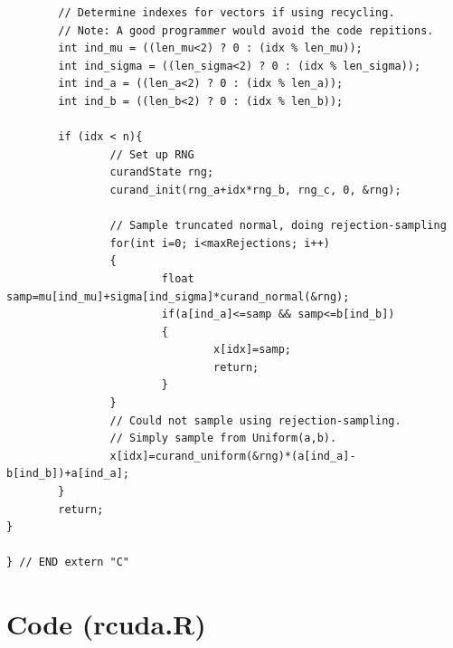 \documentclass{article}
\begin{document}
\begin{verbatim}
        // Determine indexes for vectors if using recycling.                    
        // Note: A good programmer would avoid the code repitions.              
        int ind_mu = ((len_mu<2) ? 0 : (idx % len_mu));                         
        int ind_sigma = ((len_sigma<2) ? 0 : (idx % len_sigma));                
        int ind_a = ((len_a<2) ? 0 : (idx % len_a));                            
        int ind_b = ((len_b<2) ? 0 : (idx % len_b));                            
                                                                                
        if (idx < n){                                                           
                // Set up RNG                                                   
                curandState rng;                                                
                curand_init(rng_a+idx*rng_b, rng_c, 0, &rng);                   
                                                                                
                // Sample truncated normal, doing rejection-sampling            
                for(int i=0; i<maxRejections; i++)                              
                {                                                               
                        float samp=mu[ind_mu]+sigma[ind_sigma]*curand_normal(&rng);
                        if(a[ind_a]<=samp && samp<=b[ind_b])                    
                        {                                                       
                                x[idx]=samp;                                    
                                return;                                         
                        }                                                       
                }                                                               
                // Could not sample using rejection-sampling.                   
                // Simply sample from Uniform(a,b).                             
                x[idx]=curand_uniform(&rng)*(a[ind_a]-b[ind_b])+a[ind_a];       
        }                                                                       
        return;                                                                 
}                                     
                                                                                
} // END extern "C" 
\end{verbatim}

\section{Code (rcuda.R)}
\end{document}
